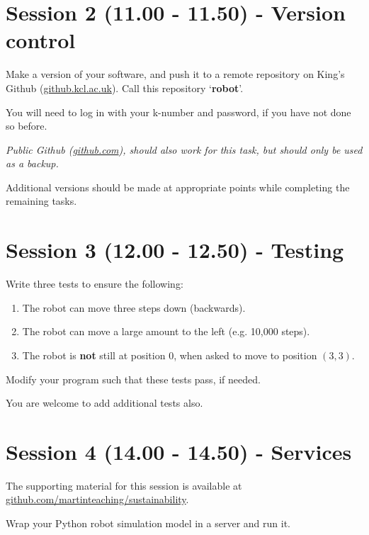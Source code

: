 \documentclass{article}
\begin{document}
\section{Session 2 (11.00 - 11.50) - Version control}

Make a version of your software, and push it to a remote repository on King's Github (\href{https://github.kcl.ac.uk/}{github.kcl.ac.uk}).
Call this repository `\textbf{robot}'.

You will need to log in with your k-number and password, if you have not done so before.

\textit{Public Github (\href{https://github.com}{github.com}), should
also work for this task, but should only be used as a backup.}

Additional versions should be made at appropriate points while completing the remaining tasks.

\section{Session 3 (12.00 - 12.50) - Testing}

Write three tests to ensure the following:

\begin{enumerate}

    \item The robot can move three steps down (backwards).

    \item The robot can move a large amount to the left (e.g. 10,000 steps).

    \item The robot is \textbf{not} still at position 0, when asked to move to position $(3, 3)$.

\end{enumerate}

Modify your program such that these tests pass, if needed.

You are welcome to add additional tests also.

\section{Session 4 (14.00 - 14.50) - Services}

The supporting material for this session is available at
\href{https://github.com/martinteaching/sustainability}{github.com/martinteaching/sustainability}.

Wrap your Python robot simulation model in a server and run it.
\end{document}
